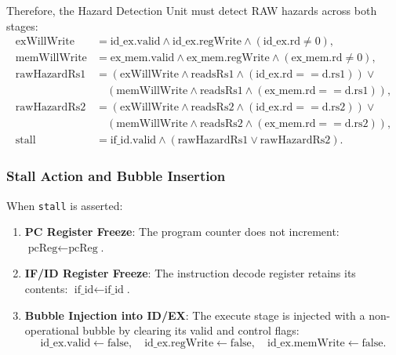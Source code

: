 Therefore, the Hazard Detection Unit must detect RAW hazards across both stages:
\begin{align}
\text{exWillWrite}  &= \text{id\_ex.valid} \land \text{id\_ex.regWrite} \land (\text{id\_ex.rd} \neq 0), \\
\text{memWillWrite} &= \text{ex\_mem.valid} \land \text{ex\_mem.regWrite} \land (\text{ex\_mem.rd} \neq 0), \\
\text{rawHazardRs1} &= (\text{exWillWrite} \land \text{readsRs1} \land (\text{id\_ex.rd} == \text{d.rs1})) \lor \nonumber \\
                    &\quad (\text{memWillWrite} \land \text{readsRs1} \land (\text{ex\_mem.rd} == \text{d.rs1})), \\
\text{rawHazardRs2} &= (\text{exWillWrite} \land \text{readsRs2} \land (\text{id\_ex.rd} == \text{d.rs2})) \lor \nonumber \\
                    &\quad (\text{memWillWrite} \land \text{readsRs2} \land (\text{ex\_mem.rd} == \text{d.rs2})), \\
\text{stall}        &= \text{if\_id.valid} \land (\text{rawHazardRs1} \lor \text{rawHazardRs2}).
\end{align}

\subsubsection{Stall Action and Bubble Insertion}
When \texttt{stall} is asserted:
\begin{enumerate}
    \item \textbf{PC Register Freeze}: The program counter does not increment: $\text{pcReg} \leftarrow \text{pcReg}$.
    \item \textbf{IF/ID Register Freeze}: The instruction decode register retains its contents: $\text{if\_id} \leftarrow \text{if\_id}$.
    \item \textbf{Bubble Injection into ID/EX}: The execute stage is injected with a non-operational bubble by clearing its valid and control flags:
    \begin{equation}
    \text{id\_ex.valid} \leftarrow \text{false}, \quad \text{id\_ex.regWrite} \leftarrow \text{false}, \quad \text{id\_ex.memWrite} \leftarrow \text{false}.
    \end{equation}
\end{enumerate}

